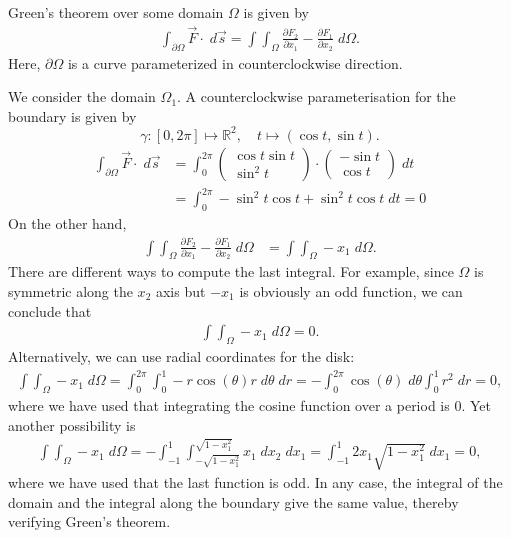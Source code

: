 \documentclass[11pt]{article}
\begin{document}
\begin{solution}   
   Green's theorem over some domain $\Omega$ is given by 
   \begin{gather*}
        \int_{\partial \Omega} \vec{F} \cdot \;d\vec{s} 
        = 
        \int \int_{\Omega} \frac{\partial F_{2}}{\partial x_{1}} - \frac{\partial F_{1}}{\partial x_{2}} \;d \Omega
        .
    \end{gather*}
    Here, $\partial\Omega$ is a curve parameterized in counterclockwise direction. 
    
    We consider the domain $\Omega_{1}$. 
    A counterclockwise parameterisation for the boundary is given by 
    $$
        \gamma: [0,2\pi] \mapsto \mathbb{R}^2, \quad t\mapsto  (\cos t, \sin t)
        .
    $$
    \begin{align*}
        \int_{\partial \Omega} \vec{F} \cdot \;d\vec{s} 
        &= 
        \int_0^ {2\pi} 
        \begin{pmatrix} \cos t \sin t\\ \sin^2 t \end{pmatrix} 
        \cdot 
        \begin{pmatrix} -\sin t \\ \cos t \end{pmatrix} \; d t 
        \\&= 
        \int_0^{2\pi} -\sin^2 t\cos t + \sin^ 2 t \cos t \;dt = 0
    \end{align*}
    On the other hand, 
    \begin{align*}
        \int \int_{\Omega} \frac{\partial F_{2}}{\partial x_{1}} - \frac{\partial F_{1}}{\partial x_{2}} \;d \Omega &= \int \int_{\Omega} -x_{1} \; d\Omega.
    \end{align*}
    There are different ways to compute the last integral. 
	For example, since $\Omega$ is symmetric along the $x_{2}$ axis but $-x_{1}$ is obviously an odd function,
	we can conclude that 
	\begin{align*}
        \int \int_{\Omega} -x_{1} \; d\Omega = 0.
    \end{align*}
	Alternatively, we can use radial coordinates for the disk: 
    \begin{align*}
        \int \int_{\Omega} -x_{1} \; d\Omega
		= 
		\int_0^ {2\pi} \int_0^1 -r\cos(\theta) r \;d\theta\;dr
        = 
		-\int_0^ {2\pi} \cos(\theta) \;d \theta \int_0^1 r^ 2 \;d r = 0,
    \end{align*}
    where we have used that integrating the cosine function over a period is $0$. 
	Yet another possibility is 
	\begin{align*}
        \int \int_{\Omega} -x_{1} \; d\Omega
		= 
		-
		\int_{-1}^{1} \int_{-\sqrt{1-x_{1}^2}}^{\sqrt{1-x_{1}^2}}
		x_{1} \;dx_{2} \;dx_{1}
        = 
		\int_{-1}^{1} 
		2x_{1} \sqrt{1-x_{1}^2} \;dx_{1}
        =
		0
		,
    \end{align*}
	where we have used that the last function is odd. 
	In any case, the integral of the domain and the integral along the boundary give the same value, 
	thereby verifying Green's theorem.
    

\end{solution}
\end{document}
